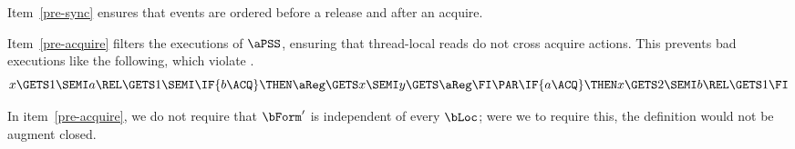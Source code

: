 



Item~\ref{pre-sync} ensures that events are ordered before a release and
after an acquire.

Item~\ref{pre-acquire} filters the executions of $\aPSS$, ensuring that
thread-local reads do not cross acquire actions.  This prevents bad executions like the following, which violate \drfsc. 
\begin{displaymath}
  x\GETS1 \SEMI
  a\REL\GETS1 \SEMI
  \IF{b\ACQ}\THEN  \aReg\GETS x\SEMI y\GETS\aReg \FI
  \PAR
  \IF{a\ACQ}\THEN  x\GETS 2\SEMI b\REL\GETS1 \FI
\end{displaymath}
\begin{tikzdisplay}[node distance=1em]
\end{tikzdisplay}
In item~\ref{pre-acquire}, we do not require that $\bForm'$ is independent of
every $\bLoc$; were we to require this, the definition would not be augment closed.

